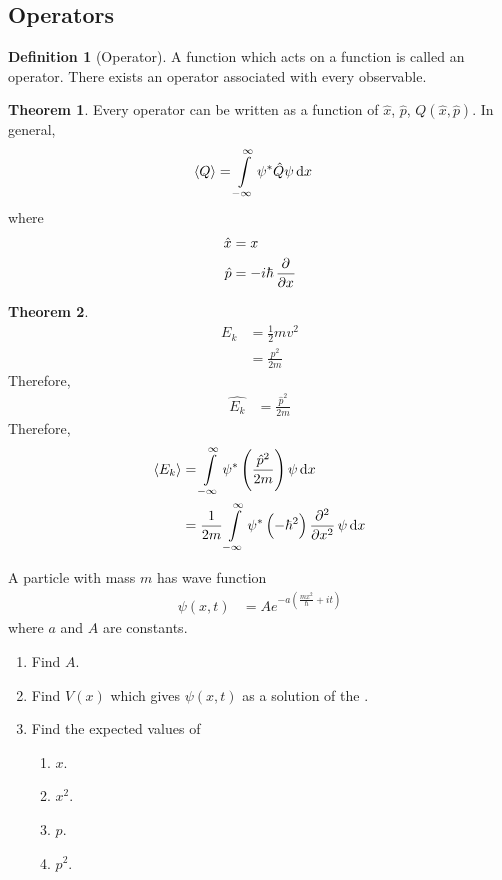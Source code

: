 \documentclass[titlepage, fleqn, a4paper, 12pt, twoside]{article}
\theoremstyle{definition}
\newtheorem{definition}{Definition}
\theoremstyle{theorem}
\newtheorem{theorem}{Theorem}
\let\Oldsubsection\subsection
\renewcommand{\subsection}{\FloatBarrier\Oldsubsection}
\begin{document}
\subsection{Operators}

\begin{definition}[Operator]
	A function which acts on a function is called an operator.
	There exists an operator associated with every observable.
\end{definition}

\begin{theorem}
	Every operator can be written as a function of $\hat{x}$, $\hat{p}$, $Q\left( \hat{x},\hat{p} \right)$.
	In general,
	\begin{align*}
		\langle Q \rangle & = \int\limits_{-\infty}^{\infty} \psi^* \hat{Q} \psi \dif x
	\end{align*}
	where
	\begin{align*}
		\hat{x} & = x \\
		\hat{p} & = -i \hbar \dpd{}{x}
	\end{align*}
\end{theorem}

\begin{theorem}
	\begin{align*}
		E_k & = \frac{1}{2} m v^2 \\
                    & = \frac{p^2}{2 m}
	\end{align*}
	Therefore,
	\begin{align*}
		\hat{E_k} & = \frac{\hat{p}^2}{2 m}
	\end{align*}
	Therefore,
	\begin{align*}
		\langle E_k \rangle & = \int\limits_{-\infty}^{\infty} \psi^* \left( \frac{\hat{p}^2}{2 m} \right) \psi \dif x \\
                                    & = \frac{1}{2 m} \int\limits_{-\infty}^{\infty} \psi^* \left( -\hbar^2 \right) \dpd[2]{}{x} \psi \dif x
	\end{align*}
\end{theorem}

\begin{question}
	A particle with mass $m$ has wave function
	\begin{align*}
		\psi(x,t) & = A e^{-a \left( \frac{m x^2}{\hbar} + i t \right)}
	\end{align*}
	where $a$ and $A$ are constants.
	\begin{enumerate}
		\item Find $A$.
		\item Find $V(x)$ which gives $\psi(x,t)$ as a solution of the .
		\item Find the expected values of
			\begin{enumerate}
				\item $x$.
				\item $x^2$.
				\item $p$.
				\item $p^2$.
			\end{enumerate}
	\end{enumerate}
\end{question}
\end{document}
